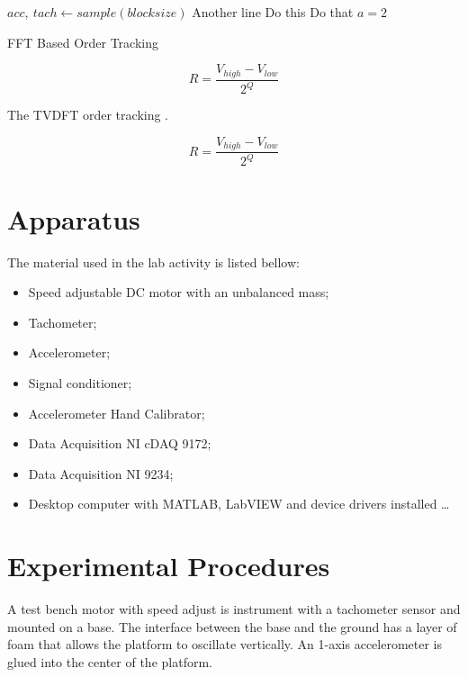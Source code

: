 \documentclass[10pt,letterpaper,twocolumn]{article}
\begin{document}
	\begin{algorithm}
		\begin{algorithmic}[1]
			\STATE $ acc,\ tach \leftarrow sample(blocksize) $
			\STATE Another line
			\STATE Do this
			\STATE Do that $ a = 2 $
		\end{algorithmic}
		\caption{FFT Based Order Tracking}
		\label{algo:fft}
	\end{algorithm}
	
    \begin{equation}
        R = \dfrac{V_{high} - V_{low}}{2^Q}
        \label{eq:resolution}
    \end{equation} 
	
	The TVDFT order tracking .
	
    \begin{equation}
        R = \dfrac{V_{high} - V_{low}}{2^Q}
        \label{eq:resolution}
    \end{equation} 

\section{Apparatus}
    The material used in the lab activity is listed bellow:

    \begin{itemize}
		\item Speed adjustable DC motor with an unbalanced mass; 
		\item Tachometer; 
		\item Accelerometer;  
		\item Signal conditioner; 
		\item Accelerometer Hand Calibrator; 
		\item Data Acquisition NI cDAQ 9172;
		\item Data Acquisition NI 9234;
		\item Desktop computer with MATLAB, LabVIEW and device drivers installed \ldots
    \end{itemize}


\section{Experimental Procedures}
	A test bench motor with speed adjust is instrument with a tachometer sensor and mounted on a base. The interface between the base and the ground has a layer of foam that allows the platform to oscillate vertically. An 1-axis accelerometer is glued into the center of the platform.
	
\end{document}
